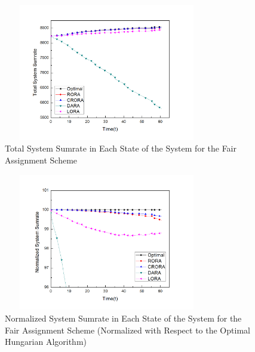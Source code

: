 \documentclass[times]{dacauth}
\begin{document}
\begin{figure}[t]
	{ %
		\setlength{\fboxsep}{1.5pt}%
		\setlength{\fboxrule}{1.5pt}%
		\centering
		\includegraphics[width=90mm,height=60mm]{Graph/sumrateFairJournal.jpg}
		\vspace{-0.2cm}
		\caption{Total System Sumrate in Each State of the System for the Fair Assignment Scheme }
		 \label{fig:sum_f}
	}
	\vspace{-.5cm}
\end{figure}

\begin{figure}[t]
	{ %
		\setlength{\fboxsep}{1.5pt}%
		\setlength{\fboxrule}{1.5pt}%
		\centering
		\includegraphics[width=90mm,height=60mm]{Graph/NormalizedsumrateFairJournal.jpg}
		\vspace{-0.2cm}
		\caption{Normalized System Sumrate in Each State of the System for the Fair Assignment Scheme (Normalized with Respect to the Optimal Hungarian Algorithm)} \label{fig:sum_f_N}
	}
	\vspace{-.5cm}
\end{figure}
\end{document}
